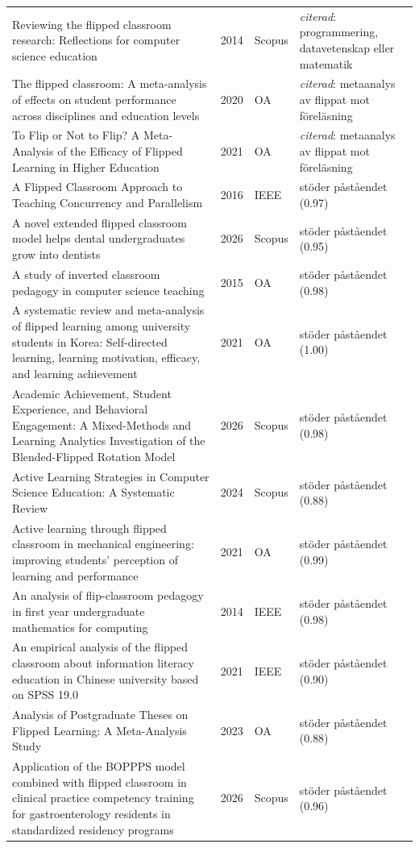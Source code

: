\begin{longtable}{@{}%
  >{\raggedright\arraybackslash}p{}c%
  >{\raggedright\arraybackslash}p{}%
  >{\raggedright\arraybackslash}p{}@{}}
Reviewing the flipped classroom research: Reflections for computer science education & 2014 & Scopus & \emph{citerad}: programmering, datavetenskap eller matematik \\
The flipped classroom: A meta-analysis of effects on student performance across disciplines and education levels & 2020 & OA & \emph{citerad}: metaanalys av flippat mot föreläsning \\
To Flip or Not to Flip? A Meta-Analysis of the Efficacy of Flipped Learning in Higher Education & 2021 & OA & \emph{citerad}: metaanalys av flippat mot föreläsning \\
A Flipped Classroom Approach to Teaching Concurrency and Parallelism & 2016 & IEEE & stöder påståendet (0.97) \\
A novel extended flipped classroom model helps dental undergraduates grow into dentists & 2026 & Scopus & stöder påståendet (0.95) \\
A study of inverted classroom pedagogy in computer science teaching & 2015 & OA & stöder påståendet (0.98) \\
A systematic review and meta-analysis of flipped learning among university students in Korea: Self-directed learning, learning motivation, efficacy, and learning achievement & 2021 & OA & stöder påståendet (1.00) \\
Academic Achievement, Student Experience, and Behavioral Engagement: A Mixed-Methods and Learning Analytics Investigation of the Blended-Flipped Rotation Model & 2026 & Scopus & stöder påståendet (0.98) \\
Active Learning Strategies in Computer Science Education: A Systematic Review & 2024 & Scopus & stöder påståendet (0.88) \\
Active learning through flipped classroom in mechanical engineering: improving students' perception of learning and performance & 2021 & OA & stöder påståendet (0.99) \\
An analysis of flip-classroom pedagogy in first year undergraduate mathematics for computing & 2014 & IEEE & stöder påståendet (0.98) \\
An empirical analysis of the flipped classroom about information literacy education in Chinese university based on SPSS 19.0 & 2021 & IEEE & stöder påståendet (0.90) \\
Analysis of Postgraduate Theses on Flipped Learning: A Meta-Analysis Study & 2023 & OA & stöder påståendet (0.88) \\
Application of the BOPPPS model combined with flipped classroom in clinical practice competency training for gastroenterology residents in standardized residency programs & 2026 & Scopus & stöder påståendet (0.96) \\

\end{longtable}
